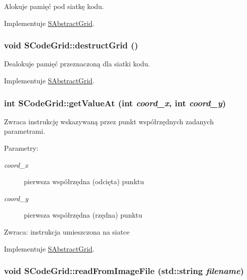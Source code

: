Alokuje pamięć pod siatkę kodu. 

Implementuje \hyperlink{classSAbstractGrid_919248aad138ffb1c969e73c3e637dcd}{SAbstractGrid}.\hypertarget{classSCodeGrid_6bd4c1bf841bd09c2ffb2e019c08b4ed}{
\subsubsection[{destructGrid}]{\setlength{\rightskip}{0pt plus 5cm}void SCodeGrid::destructGrid ()}}
\label{classSCodeGrid_6bd4c1bf841bd09c2ffb2e019c08b4ed}


Dealokuje pamięć przeznaczoną dla siatki kodu. 

Implementuje \hyperlink{classSAbstractGrid_fb63d8cf5210c3606a3b7add19f06833}{SAbstractGrid}.\hypertarget{classSCodeGrid_c57d52a49a55c91068fe0eb541e721f8}{
\subsubsection[{getValueAt}]{\setlength{\rightskip}{0pt plus 5cm}int SCodeGrid::getValueAt (int {\em coord\_\-x}, \/  int {\em coord\_\-y})}}
\label{classSCodeGrid_c57d52a49a55c91068fe0eb541e721f8}


Zwraca instrukcję wskazywaną przez punkt współrzędnych zadanych parametrami. \begin{Desc}
\item[Parametry:]
\begin{description}
\item[{\em coord\_\-x}]pierwsza współrzędna (odcięta) punktu \item[{\em coord\_\-y}]pierwsza współrzędna (rzędna) punktu \end{description}
\end{Desc}
\begin{Desc}
\item[Zwraca:]instrukcja umieszczona na siatce \end{Desc}


Implementuje \hyperlink{classSAbstractGrid_d8772e08d58f970d885775cb9682bf6d}{SAbstractGrid}.\hypertarget{classSCodeGrid_47cd37dd8ae964b4fbec965a9345de61}{
\subsubsection[{readFromImageFile}]{\setlength{\rightskip}{0pt plus 5cm}void SCodeGrid::readFromImageFile (std::string {\em filename})}}
\label{classSCodeGrid_47cd37dd8ae964b4fbec965a9345de61}


